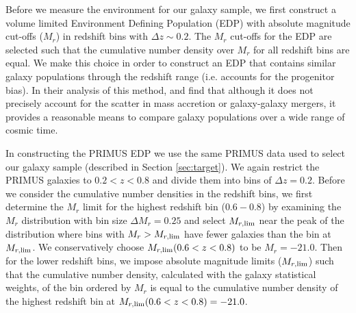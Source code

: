 \documentclass{emulateapj}
\begin{document}


Before we measure the environment for our galaxy sample, we first
construct a volume limited Environment Defining Population (EDP) with
absolute magnitude cut-offs ($M_{r}$) in redshift bins with $\Delta z
\sim 0.2$. The $M_{r}$ cut-offs for the EDP are selected such that the
cumulative number density over $M_{r}$ for all redshift bins are
equal.  We make this choice in order to construct an EDP that contains
similar galaxy populations through the redshift range (i.e. accounts
for the progenitor bias). In their analysis of this method,
\cite{Behroozi:2013aa} and \cite{Leja:2013aa} find that although it
does not precisely account for the scatter in mass accretion or
galaxy-galaxy mergers, it provides a reasonable means to compare
galaxy populations over a wide range of cosmic time.

In constructing the PRIMUS EDP we use the same PRIMUS data used to select our galaxy sample (described in Section \ref{sec:target}). We again restrict the PRIMUS galaxies to $0.2 < z < 0.8$ and divide them into bins of $\Delta z = 0.2$. Before we consider the cumulative number densities in the redshift bins, we first determine the $M_r$ limit for the highest redshift bin ($0.6-0.8$) by examining the $M_{r}$ distribution with bin size $\Delta M_{r} = 0.25$ and select $M_{r,\rm{lim}}$ near the peak of the distribution where bins with $M_{r} > M_{r,\rm{lim}}$ have fewer galaxies than the bin at $M_{r, \rm{lim}}$. We conservatively choose $M_{r, \rm{lim}}(0.6 < z < 0.8)$ to be $M_{r} = -21.0$. Then for the lower redshift bins, we impose absolute magnitude limits ($M_{r,\rm{lim}}$) such that the cumulative number density, calculated with the galaxy statistical weights, of the bin ordered by $M_{r}$ is equal to the cumulative number density of the highest redshift bin at $M_{r, \rm{lim}}(0.6 < z < 0.8) = -21.0$. 
\end{document}
